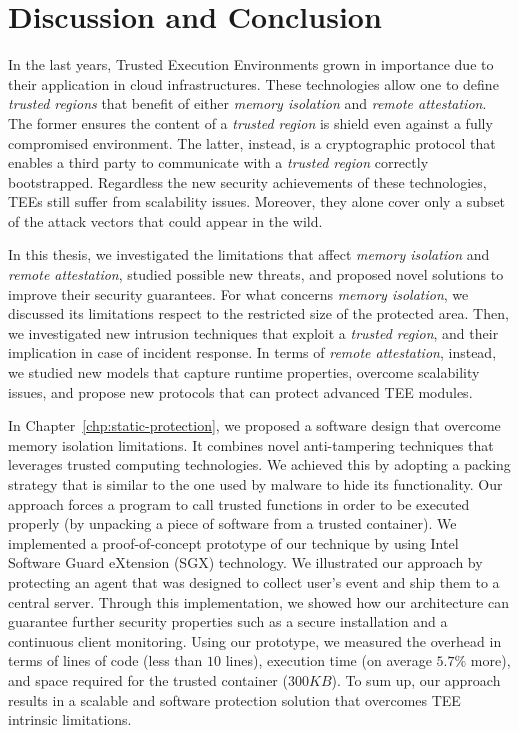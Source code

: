 \chapter{Discussion and Conclusion}
\label{chp:conclusion}

In the last years, Trusted Execution Environments grown in importance due to 
their application in cloud infrastructures.
These technologies allow one to define \emph{trusted regions} that benefit of 
either \emph{memory isolation} and \emph{remote attestation}.
The former ensures the content of a \emph{trusted region} is shield even 
against a fully compromised environment.
The latter, instead, is a cryptographic protocol that enables a third party to 
communicate with a \emph{trusted region} correctly bootstrapped.
Regardless the new security achievements of these technologies, TEEs still 
suffer from scalability issues. 
Moreover, they alone cover only a subset of the attack vectors that could 
appear in the wild.
		
In this thesis, we investigated the limitations that affect \emph{memory 
isolation} and \emph{remote attestation}, studied possible new threats, and 
proposed novel solutions to improve their security guarantees.
For what concerns \emph{memory isolation}, we discussed its limitations 
respect to the restricted size of the protected area.
Then, we investigated new intrusion techniques that exploit 
a \emph{trusted region}, and their implication in case of incident response.
In terms of \emph{remote attestation}, instead, we studied new models that 
capture runtime properties, overcome scalability issues, and propose new 
protocols that can protect advanced TEE modules.

In Chapter~\ref{chp:static-protection}, we proposed a software design that 
overcome memory isolation limitations. It combines novel anti-tampering 
techniques that leverages trusted computing technologies.
We achieved this by adopting a packing strategy that is similar to the one used 
by malware to hide its functionality.
Our approach forces a program to call trusted functions in order to be executed 
properly (by unpacking a piece of software from a trusted container). 
We implemented a proof-of-concept prototype of our technique by using Intel 
Software Guard eXtension (SGX) technology.
We illustrated our approach by protecting an agent that was designed to collect 
user's event and ship them to a central server.
Through this implementation, we showed how our architecture can guarantee 
further security properties such as a secure installation and a continuous 
client monitoring. Using our prototype, we measured the overhead in terms of 
lines of code (less than $10$ lines), execution time (on average $5.7\%$ more), 
and space required for the trusted container ($300KB$).
To sum up, our approach results in a scalable and software protection solution 
that overcomes TEE intrinsic limitations.

